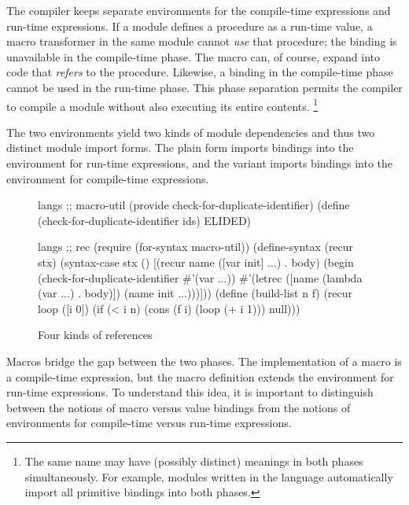 \begin{schemeregion}
The compiler keeps separate environments for the compile-time
expressions and run-time expressions. If a module defines a procedure
as a run-time value, a macro transformer in the same module cannot
\emph{use} that procedure; the binding is unavailable in the
compile-time phase. The macro can, of course, expand into code that
\emph{refers} to the procedure.  Likewise, a binding in the
compile-time phase cannot be used in the run-time phase. This phase
separation permits the compiler to compile a module without also
executing its entire contents.%
\footnote{The same name may have (possibly distinct) meanings in both phases
 simultaneously. For example, modules written in the 
 language automatically import all primitive bindings into both
 phases.}

The two environments yield two kinds of module dependencies and thus two
distinct module import forms. The plain  form imports
bindings into the  environment for run-time expressions, and the
 variant imports bindings into the
environment for compile-time expressions.

\begin{figure}
\begin{schemedisplay}
langs ;; macro-util
(provide check-for-duplicate-identifier)
(define (check-for-duplicate-identifier ids) ELIDED)

langs ;; rec
(require (for-syntax macro-util))
(define-syntax (recur stx)
  (syntax-case stx ()
    [(recur name ([var init] ...) . body)
     (begin
       (check-for-duplicate-identifier #'(var ...))
       #'(letrec ([name (lambda (var ...) . body)])
	   (name init ...)))]))
(define (build-list n f)
  (recur loop ([i 0])
    (if (< i n)
	(cons (f i) (loop (+ i 1)))
	null)))
\end{schemedisplay}
\caption{Four kinds of references}
\label{fig:four-references}
\end{figure}

Macros bridge the gap between the two phases. The implementation of a
macro is a compile-time expression, but the macro definition extends
the environment for run-time expressions. To understand this idea, it
is important to distinguish between the notions of macro versus value
bindings from the notions of environments for compile-time versus run-time
expressions.


\end{schemeregion}
